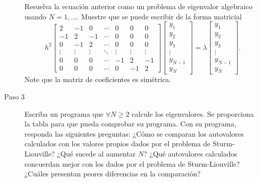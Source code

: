 \begin{description}
	      Resuelva la ecuación anterior como un problema de
	      eigenvalor algebraico usando $N=1,\dotsc$.
	      Muestre que se puede escribir de la forma matricial
	      \begin{equation*}
		      h^{2}
		      \begin{bmatrix}
			      2      & -1     & 0      & \cdots & 0      & 0      & 0      \\
			      -1     & 2      & -1     & \cdots & 0      & 0      & 0      \\
			      0      & -1     & 2      & \cdots & 0      & 0      & 0      \\
			      \vdots & \vdots & \vdots & \ddots & \vdots & \vdots & \vdots \\
			      0      & 0      & 0      & \cdots & -1     & 2      & -1     \\
			      0      & 0      & 0      & \cdots & 0      & -1     & 2
		      \end{bmatrix}
		      \begin{bmatrix}
			      y_{1}   \\
			      y_{2}   \\
			      y_{3}   \\
			      \vdots  \\
			      y_{N-1} \\
			      y_{N}
		      \end{bmatrix}=
		      \lambda
		      \begin{bmatrix}
			      y_{1}   \\
			      y_{2}   \\
			      y_{3}   \\
			      \vdots  \\
			      y_{N-1} \\
			      y_{N}
		      \end{bmatrix}.
	      \end{equation*}
	      Note que la matriz de coeficientes es simétrica.

	\item[Paso 3]

	      Escriba un programa que $\forall N\geq 2$ calcule los
	      eigenvalores.
	      Se proporciona la tabla para que pueda comprobar su
	      programa.
	      Con su programa, responda las siguientes preguntas:
	      ¿Cómo se comparan los autovalores calculados con los
	      valores propios dados por el problema de Sturm-Liouville?
	      ¿Qué sucede al aumentar $N$?
	      ¿Qué autovalores calculados concuerdan mejor con los dados
	      por el problema de Sturm-Liouville?
	      ¿Cuáles presentan peores diferencias en la comparación?


\end{description}
